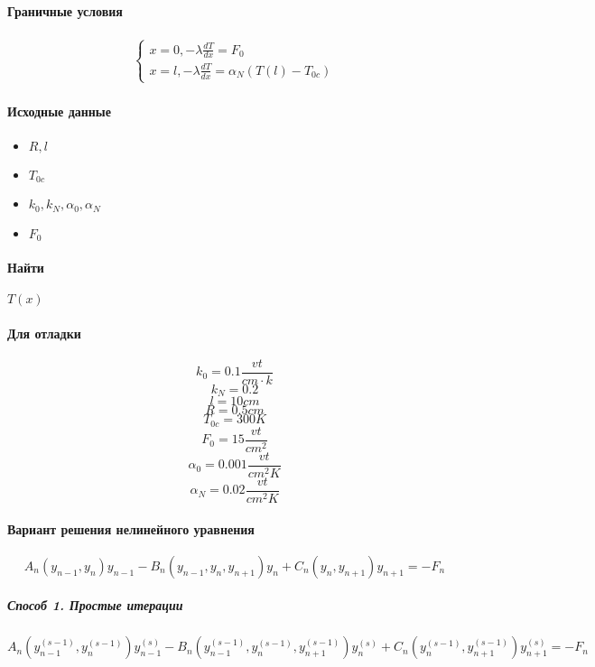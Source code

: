 \paragraph{Граничные условия}

\begin{align*}
\begin{cases}
x = 0, -\lambda \frac{dT}{dx} = F_0\\
x = l, -\lambda \frac{dT}{dx} = \alpha_N(T(l) - T_{0c})
\end{cases}
\end{align*}

\paragraph{Исходные данные}

\begin{itemize}
	\item $R, l$
	\item $T_{0c}$
	\item $k_0, k_N, \alpha_0, \alpha_N$
	\item $F_0$
\end{itemize}

\paragraph{Найти} $T(x)$

\paragraph{Для отладки}
\[
k_0 = 0.1 \frac{vt}{cm \cdot k}
\]
\[
k_N = 0.2
\]
\[
l = 10 cm
\]
\[
R = 0.5 cm
\]
\[
T_{0c} = 300K
\]
\[
F_0 = 15 \frac{vt}{cm^2}
\]
\[
\alpha_0 = 0.001 \frac{vt}{cm^2 K}
\]
\[
\alpha_N = 0.02 \frac{vt}{cm^2 K}
\]

\paragraph{Вариант решения нелинейного уравнения}

\[
A_n(y_{n-1}, y_n) y_{n-1} - B_n(y_{n-1}, y_n, y_{n+1}) y_n + C_n (y_n, y_{n+1}) y_{n+1} = -F_n
\]

\subparagraph{Способ 1. Простые итерации}

\[
A_n\left(y^{(s-1)}_{n-1}, y^{(s-1)}_n\right) y^{(s)}_{n-1} - B_n\left(y^{(s-1)}_{n-1}, y^{(s-1)}_n, y^{(s-1)}_{n+1}\right) y^{(s)}_n + C_n \left(y^{(s-1)}_n, y^{(s-1)}_{n+1}\right) y^{(s)}_{n+1} = -F_n
\]

